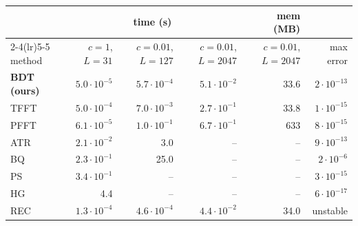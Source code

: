 \begin{tabular}{lrrrrr}
\toprule
 & \multicolumn{3}{c}{time (s)} & mem (MB) & \\
\cmidrule(lr){2-4}\cmidrule(lr){5-5}
method & $c{=}1$, $L{=}31$ & $c{=}0.01$, $L{=}127$ & $c{=}0.01$, $L{=}2047$ & $c{=}0.01$, $L{=}2047$ & max error\\
\midrule
\textbf{BDT (ours)} & $5.0\cdot10^{-5}$ & $5.7\cdot10^{-4}$ & $5.1\cdot10^{-2}$ & 33.6 & $2\cdot10^{-13}$\\
TFFT & $5.0\cdot10^{-4}$ & $7.0\cdot10^{-3}$ & $2.7\cdot10^{-1}$ & 33.8 & $1\cdot10^{-15}$\\
PFFT & $6.1\cdot10^{-5}$ & $1.0\cdot10^{-1}$ & $6.7\cdot10^{-1}$ & 633 & $8\cdot10^{-15}$\\
ATR & $2.1\cdot10^{-2}$ & 3.0 & -- & -- & $9\cdot10^{-13}$\\
BQ & $2.3\cdot10^{-1}$ & 25.0 & -- & -- & $2\cdot10^{-6}$\\
PS & $3.4\cdot10^{-1}$ & -- & -- & -- & $3\cdot10^{-15}$\\
HG & 4.4 & -- & -- & -- & $6\cdot10^{-17}$\\
REC & $1.3\cdot10^{-4}$ & $4.6\cdot10^{-4}$ & $4.4\cdot10^{-2}$ & 34.0 & unstable\\
\bottomrule
\end{tabular}
